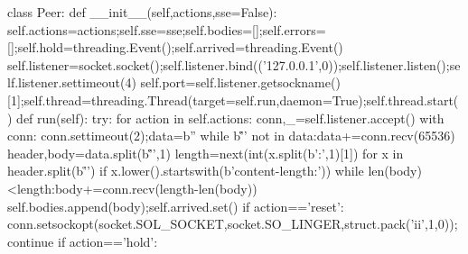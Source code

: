 class Peer:
    def __init__(self,actions,sse=False):
        self.actions=actions;self.sse=sse;self.bodies=[];self.errors=[];self.hold=threading.Event();self.arrived=threading.Event()
        self.listener=socket.socket();self.listener.bind(('127.0.0.1',0));self.listener.listen();self.listener.settimeout(4)
        self.port=self.listener.getsockname()[1];self.thread=threading.Thread(target=self.run,daemon=True);self.thread.start()
    def run(self):
        try:
            for action in self.actions:
                conn,_=self.listener.accept()
                with conn:
                    conn.settimeout(2);data=b''
                    while b'\r\n\r\n' not in data:data+=conn.recv(65536)
                    header,body=data.split(b'\r\n\r\n',1)
                    length=next(int(x.split(b':',1)[1]) for x in header.split(b'\r\n') if x.lower().startswith(b'content-length:'))
                    while len(body)<length:body+=conn.recv(length-len(body))
                    self.bodies.append(body);self.arrived.set()
                    if action=='reset':
                        conn.setsockopt(socket.SOL_SOCKET,socket.SO_LINGER,struct.pack('ii',1,0));continue
                    if action=='hold':
